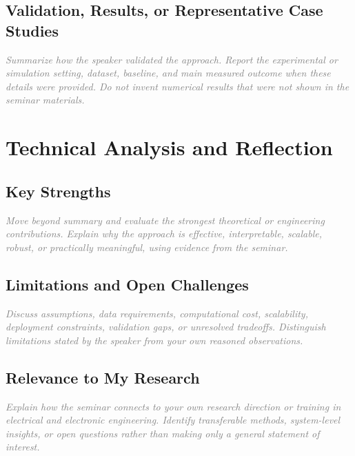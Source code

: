 \documentclass[a4paper,12pt]{article}
\newcommand{\placeholder}[1]{\textcolor{gray}{\textit{#1}}}
\begin{document}

\subsection{Validation, Results, or Representative Case Studies}

\placeholder{Summarize how the speaker validated the approach. Report the experimental or simulation setting, dataset, baseline, and main measured outcome when these details were provided. Do not invent numerical results that were not shown in the seminar materials.}

\section{Technical Analysis and Reflection}

\subsection{Key Strengths}

\placeholder{Move beyond summary and evaluate the strongest theoretical or engineering contributions. Explain why the approach is effective, interpretable, scalable, robust, or practically meaningful, using evidence from the seminar.}

\subsection{Limitations and Open Challenges}

\placeholder{Discuss assumptions, data requirements, computational cost, scalability, deployment constraints, validation gaps, or unresolved tradeoffs. Distinguish limitations stated by the speaker from your own reasoned observations.}

\subsection{Relevance to My Research}

\placeholder{Explain how the seminar connects to your own research direction or training in electrical and electronic engineering. Identify transferable methods, system-level insights, or open questions rather than making only a general statement of interest.}
\end{document}
